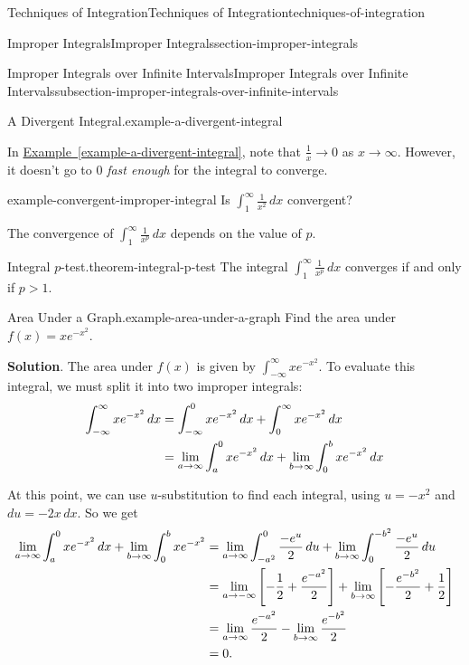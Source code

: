 \documentclass[oneside,10pt,]{book}
\numberwithin{equation}{section}
\newcommand{\gt}{>}
\begin{document}
\begin{chapterptx}{Techniques of Integration}{}{Techniques of Integration}{}{}{techniques-of-integration}
\begin{sectionptx}{Improper Integrals}{}{Improper Integrals}{}{}{section-improper-integrals}
\begin{subsectionptx}{Improper Integrals over Infinite Intervals}{}{Improper Integrals over Infinite Intervals}{}{}{subsection-improper-integrals-over-infinite-intervals}
\begin{example}{A Divergent Integral.}{example-a-divergent-integral}
\end{example}
\hypertarget{p-584}{}%
In \hyperref[example-a-divergent-integral]{Example~\ref{example-a-divergent-integral}}, note that \(\frac{1}{x}\to0\) as \(x\to\infty\). However, it doesn't go to \(0\) \emph{fast enough} for the integral to converge.%
\begin{example}{}{example-convergent-improper-integral}%
\hypertarget{p-585}{}%
Is \(\int_{1}^{\infty}\frac{1}{x^{2}}\,dx\) convergent?%
\end{example}
\hypertarget{p-586}{}%
The convergence of \(\int_{1}^{\infty}\frac{1}{x^{p}}\,dx\) depends on the value of \(p\).%
\begin{theorem}{Integral \(p\)-test.}{}{theorem-integral-p-test}%
\hypertarget{p-587}{}%
The integral \(\int_{1}^{\infty}\frac{1}{x^{p}}\,dx\) converges if and only if \(p \gt 1\).%
\end{theorem}
\begin{example}{Area Under a Graph.}{example-area-under-a-graph}%
\hypertarget{p-588}{}%
Find the area under \(f(x) = xe^{-x^{2}}\).%
\par\smallskip%
\noindent\textbf{Solution}.\hypertarget{solution-127}{}\quad%
\hypertarget{p-589}{}%
The area under \(f(x)\) is given by \(\int_{-\infty}^{\infty}xe^{-x^{2}}\). To evaluate this integral, we must split it into two improper integrals:%
\begin{align*}
\int_{-\infty}^{\infty}xe^{-x^{2}}\,dx & = \int_{-\infty}^{0}xe^{-x^{2}}\,dx + \int_{0}^{\infty}xe^{-x^{2}}\,dx \\
& = \lim_{a\to\-\infty}\int_{a}^{0}xe^{-x^{2}}\,dx + \lim_{b\to\infty}\int_{0}^{b}xe^{-x^{2}}\,dx 
\end{align*}
%
\par
\hypertarget{p-590}{}%
At this point, we can use \(u\)-substitution to find each integral, using \(u = -x^{2}\) and \(du = -2x\,dx\). So we get%
\begin{align*}
\lim_{a\to\-\infty}\int_{a}^{0}xe^{-x^{2}}\,dx + \lim_{b\to\infty}\int_{0}^{b}xe^{-x^{2}} & = \lim_{a\to\-\infty}\int_{-a^{2}}^{0}\frac{-e^{u}}{2}\,du + \lim_{b\to\infty}\int_{0}^{-b^{2}}\frac{-e^{u}}{2}\,du \\
& = \lim_{a\to-\infty}\left[-\frac{1}{2} + \frac{e^{-a^{2}}}{2}\right] + \lim_{b\to\infty}\left[-\frac{e^{-b^{2}}}{2} + \frac{1}{2}\right]\\
& = \lim_{a\to\infty}\frac{e^{-a^{2}}}{2} - \lim_{b\to\infty}\frac{e^{-b^{2}}}{2} \\
& = 0. 
\end{align*}

\end{example}
\end{subsectionptx}
\end{sectionptx}
\end{chapterptx}
\end{document}
